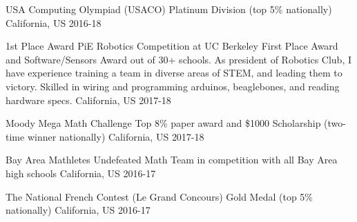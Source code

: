 



\begin{cvhonors}
  
  \cvhonor
    {USA Computing Olympiad (USACO)} %
    {Platinum Division (top 5\% nationally)}
    {California, US} %
    {2016-18} %
    
  \cvhonor
    {1st Place Award PiE Robotics Competition at UC Berkeley}  %
    {First Place Award and Software/Sensors Award out of 30+ schools. As president of Robotics Club, I have experience training a team in diverse areas of STEM, and leading them to victory. Skilled in wiring and programming arduinos, beaglebones, and reading hardware specs.}
    {California, US} %
    {2017-18} %

  \cvhonor
    {Moody Mega Math Challenge} %
    {Top 8\% paper award and \$1000 Scholarship (two-time winner nationally)}
    {California, US} %
    {2017-18} %
 
  \cvhonor
    {Bay Area Mathletes} %
    {Undefeated Math Team in competition with all Bay Area high schools}
    {California, US} %
    {2016-17} %

  \cvhonor
    {The National French Contest (Le Grand Concours)} %
    {Gold Medal (top 5\% nationally)}
    {California, US} %
    {2016-17} %
      
\end{cvhonors}
